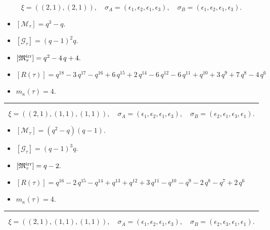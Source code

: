 \documentclass[10pt,a4paper]{amsart}
\begin{document}
$$\xi = ({(2, 1)}, {(2, 1)}),\quad \sigma_A = ({{\epsilon_1, \epsilon_2}}, {{\epsilon_1, \epsilon_3}}),\quad \sigma_B = ({{\epsilon_1, \epsilon_2}}, {{\epsilon_1, \epsilon_3}}).$$

\begin{itemize}
 \item $[\mathcal{M}_{\tau}] = q^{3} - q .$

 \item $[\mathcal{G}_{\tau}] = {\left(q - 1\right)}^{2} q .$

 \item $[{\frak M}_{\tau}^{\textrm{irr}}] = q^{2} - 4 \, q + 4 .$

 \item $[R(\tau)] = q^{18} - 3 \, q^{17} - q^{16} + 6 \, q^{15} + 2 \, q^{14} - 6 \, q^{12} - 6 \, q^{11} + q^{10} + 3 \, q^{9} + 7 \, q^{8} - 4 \, q^{6} $

 \item $m_{\kappa}(\tau) = 4 .$

 \end{itemize}
\noindent\rule{8cm}{0.4pt}

$$\xi = ({(2, 1)}, {(1, 1), (1, 1)}),\quad \sigma_A = ({{\epsilon_1, \epsilon_2}}, {{\epsilon_1}, {\epsilon_3}}),\quad \sigma_B = ({{\epsilon_2, \epsilon_1}}, {{\epsilon_3}, {\epsilon_1}}).$$

\begin{itemize}
 \item $[\mathcal{M}_{\tau}] = {\left(q^{2} - q\right)} {\left(q - 1\right)} .$

 \item $[\mathcal{G}_{\tau}] = {\left(q - 1\right)}^{3} q .$

 \item $[{\frak M}_{\tau}^{\textrm{irr}}] = q - 2 .$

 \item $[R(\tau)] = q^{16} - 2 \, q^{15} - q^{14} + q^{13} + q^{12} + 3 \, q^{11} - q^{10} - q^{9} - 2 \, q^{8} - q^{7} + 2 \, q^{6} $

 \item $m_{\kappa}(\tau) = 4 .$

 \end{itemize}
\noindent\rule{8cm}{0.4pt}

$$\xi = ({(2, 1)}, {(1, 1), (1, 1)}),\quad \sigma_A = ({{\epsilon_1, \epsilon_2}}, {{\epsilon_1}, {\epsilon_3}}),\quad \sigma_B = ({{\epsilon_2, \epsilon_3}}, {{\epsilon_1}, {\epsilon_1}}).$$
\end{document}
